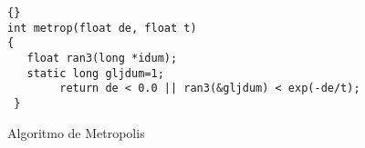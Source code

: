 \documentclass[letterpaper,12pt]{article}
\begin{document}
\pagestyle{empty}
\thispagestyle{empty}

\noindent

\begin{table}[h]
\lstset{language=C}
\lstset{commentstyle=\textit}
\lstset{frameround=trbl}
\lstset{labelstep=1}
\begin{lstlisting}[indent=8mm,gobble=0]{}
int metrop(float de, float t)
{
   float ran3(long *idum);
   static long gljdum=1;
        return de < 0.0 || ran3(&gljdum) < exp(-de/t);
 }
\end{lstlisting}
\caption{Algoritmo de Metropolis}
\label{tab:metropolis}
\end{table}
\end{document}
